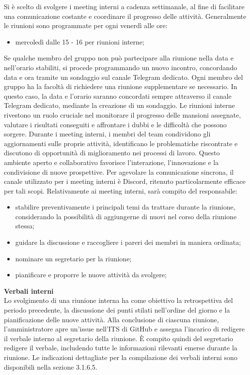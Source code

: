 Si è scelto di svolgere i meeting interni a cadenza settimanale, al fine di facilitare una comunicazione costante e coordinare il progresso delle attività.
Generalmente le riunioni sono programmate per ogni venerdì alle ore:
\begin{itemize}
	\item mercoledì dalle 15 - 16 per riunioni interne;
\end{itemize}
Se qualche membro del gruppo non può partecipare alla riunione nella data e nell’orario stabiliti, si procede programmando un nuovo incontro, concordando data e ora tramite un sondaggio sul canale Telegram dedicato.
Ogni membro del gruppo ha la facoltà di richiedere una riunione supplementare se necessario. In questo caso, la data e l’orario saranno concordati sempre attraverso il canale Telegram dedicato, mediante la creazione di un sondaggio.
Le riunioni interne rivestono un ruolo cruciale nel monitorare il progresso delle mansioni assegnate, valutare i risultati conseguiti e affrontare i dubbi e le difficoltà che possono sorgere. Durante i meeting interni, i membri del team condividono gli aggiornamenti sulle proprie attività, identificano le problematiche riscontrate e discutono di opportunità di miglioramento nei processi di lavoro. Questo ambiente aperto e collaborativo favorisce l’interazione, l’innovazione e la condivisione di nuove prospettive. Per agevolare la comunicazione sincrona, il canale utilizzato per i meeting interni è Discord, ritenuto particolarmente efficace per tali scopi.
Relativamente ai meeting interni, sarà compito del responsabile:
\begin{itemize}
	\item stabilire preventivamente i principali temi da trattare durante la riunione, considerando la possibilità di aggiungerne di nuovi nel corso della riunione stessa;
	\item guidare la discussione e raccogliere i pareri dei membri in maniera ordinata;
	\item nominare un segretario per la riunione;
	\item pianificare e proporre le nuove attività da svolgere;
\end{itemize}
\textbf{Verbali interni}\\
Lo svolgimento di una riunione interna ha come obiettivo la retrospettiva del periodo precedente, la discussione dei punti stilati nell’ordine del giorno e la pianificazione delle nuove attività.
Alla conclusione di ciascuna riunione, l’amministratore apre un’issue nell’ITS di GitHub e assegna l’incarico di redigere il verbale interno al segretario della riunione. È compito quindi del segretario redigere il verbale, includendo tutte le informazioni rilevanti emerse durante la riunione. Le indicazioni dettagliate per la compilazione dei verbali interni sono disponibili nella sezione 3.1.6.5.

